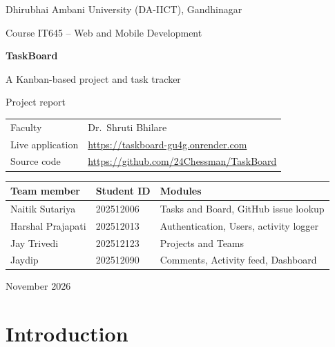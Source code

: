 \documentclass[11pt,a4paper]{article}
\begin{document}
\begin{titlepage}
\thispagestyle{empty}
\centering
{\large Dhirubhai Ambani University (DA-IICT), Gandhinagar\par}
\vspace{0.4em}
{\large Course IT645 -- Web and Mobile Development\par}
\vspace{3.2cm}
{\Huge\bfseries\color{brand} TaskBoard\par}
\vspace{0.6em}
{\Large A Kanban-based project and task tracker\par}
\vspace{0.3em}
{\large Project report\par}
\vspace{2.4cm}
\begin{tabular}{@{}ll@{}}
Faculty & Dr.\ Shruti Bhilare\\[0.3em]
Live application & \url{https://taskboard-gu4g.onrender.com}\\
Source code & \url{https://github.com/24Chessman/TaskBoard}\\
\end{tabular}

\vspace{1.8cm}
\begin{tabular}{@{}lll@{}}
\toprule
\textbf{Team member} & \textbf{Student ID} & \textbf{Modules}\\
\midrule
Naitik Sutariya & 202512006 & Tasks and Board, GitHub issue lookup\\
Harshal Prajapati & 202512013 & Authentication, Users, activity logger\\
Jay Trivedi & 202512123 & Projects and Teams\\
Jaydip & 202512090 & Comments, Activity feed, Dashboard\\
\bottomrule
\end{tabular}

\vfill
{\large November 2026\par}
\end{titlepage}

\tableofcontents
\clearpage

\section{Introduction}
\end{document}
